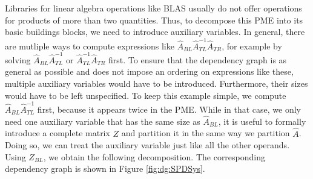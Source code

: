 %
Libraries for linear algebra operations like BLAS usually do not offer operations for products of more than two quantities. Thus, to decompose this PME into its basic buildings blocks, we need to introduce auxiliary variables. In general, there are mutliple ways to compute expressions like $\hat{A}_{BL} \hat{A}_{TL}^{-1} \hat{A}_{TR}$, for example by solving $\hat{A}_{BL} \hat{A}_{TL}^{-1}$ or $\hat{A}_{TL}^{-1} \hat{A}_{TR}$ first. To ensure that the dependency graph is as general as possible and does not impose an ordering on expressions like these, multiple auxiliary variables would have to be introduced. Furthermore, their sizes would have to be left unspecified. To keep this example simple, we compute $\hat{A}_{BL} \hat{A}_{TL}^{-1}$ first, because it appears twice in the PME. While in that case, we only need one auxiliary variable that has the same size as $\hat{A}_{BL}$, it is useful to formally introduce a complete matrix $Z$ and partition it in the same way we partition $\hat{A}$. Doing so, we can treat the auxiliary variable just like all the other operands. Using $Z_{BL}$, we obtain the following decomposition. The corresponding dependency graph is shown in Figure \ref{fig:dg:SPDSys}.
%
%
